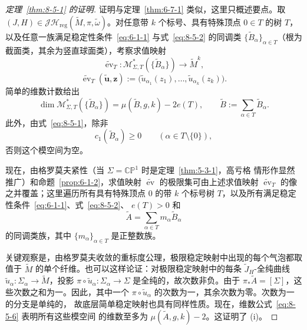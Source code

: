 \begin{proof}[定理~\ref{thm:8-5-1} 的证明]
证明与定理~\ref{thm:6-7-1} 类似，这里只概述要点。取
$(J,H)\in\mathcal J\mathcal H_{\mathrm{reg}}
(\widetilde M,\pi,\widetilde\omega)$。对任意带 $k$ 个标号、具有特殊顶点 $0\in T$ 的树
$T$，以及任意一族满足稳定性条件~\eqref{eq:6-1-1} 与式~\eqref{eq:8-5-2} 的同调类
$\{\widetilde B_\alpha\}_{\alpha\in T}$（根为截面类，其余为竖直球面类），考察求值映射
\[
  \widetilde{\operatorname{ev}}_T:
  \mathcal M^*_{\Sigma,T}(\{\widetilde B_\alpha\})
  \longrightarrow\widetilde M^k,
\]
\[
  \widetilde{\operatorname{ev}}_T(\widetilde{\mathbf u},\mathbf z)
  :=\bigl(\widetilde u_{\alpha_1}(z_1),\ldots,
    \widetilde u_{\alpha_k}(z_k)\bigr).
\]
简单的维数计数给出
\begin{equation}\label{eq:8-5-6}
  \dim\mathcal M^*_{\Sigma,T}(\{\widetilde B_\alpha\})
  =\mu(\widetilde B,g,k)-2e(T),
  \qquad
  \widetilde B:=\sum_{\alpha\in T}\widetilde B_\alpha.
\end{equation}
此外，由式~\eqref{eq:8-5-1}，除非
\[
  c_1(\widetilde B_\alpha)\ge0
  \qquad(\alpha\in T\setminus\{0\}),
\]
否则这个模空间为空。

现在，由格罗莫夫紧性（当 $\Sigma=\mathbb{CP}^1$ 时是定理~\ref{thm:5-3-1}，高亏格
情形作显然推广）和命题~\ref{prop:6-1-2}，求值映射
$\widetilde{\operatorname{ev}}$ 的极限集可由上述求值映射
$\widetilde{\operatorname{ev}}_T$ 的像之并覆盖；这里遍历所有具有特殊顶点 $0$ 的带
$k$ 个标号树 $T$，以及所有满足稳定性条件~\eqref{eq:6-1-1}、式~\eqref{eq:8-5-2}、
$e(T)>0$ 和
\begin{equation}\label{eq:8-5-7}
  \widetilde A
  =\sum_{\alpha\in T}m_\alpha\widetilde B_\alpha
\end{equation}
的同调类族，其中 $\{m_\alpha\}_{\alpha\in T}$ 是正整数族。

关键观察是，由格罗莫夫收敛的重标度公理，极限稳定映射中出现的每个气泡都取值于
$\widetilde M$ 的单个纤维。也可以这样论证：对极限稳定映射中的每条
$\widetilde J_H$-全纯曲线
$\widetilde u_\alpha:\Sigma_\alpha\to\widetilde M$，投影
$\pi\circ\widetilde u_\alpha:\Sigma_\alpha\to\Sigma$ 是全纯的，故次数非负。由于
$\pi_*\widetilde A=[\Sigma]$，这些次数之和为一。因此，其中一个
$\pi\circ\widetilde u_\alpha$ 的次数为一，其余次数为零。次数为一的分支是单纯的，
故底层简单稳定映射也具有同样性质。现在，维数公式~\eqref{eq:8-5-6} 表明所有这些模空间
的维数至多为 $\mu(\widetilde A,g,k)-2$。这证明了 (i)。


\end{proof}
